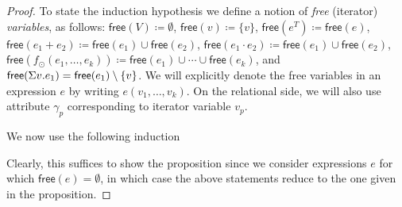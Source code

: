 \begin{proof}
To state the induction hypothesis we define a notion of \textit{free} (iterator) \textit{variables}, as follows:
$\mathsf{free}(V)\coloneqq \emptyset$, $\mathsf{free}(v)\coloneqq \{v\}$, $\mathsf{free}(e^T)\coloneqq \mathsf{free}(e)$, $\mathsf{free}(e_1+e_2)\coloneqq \mathsf{free}(e_1)\cup \mathsf{free}(e_2)$, $\mathsf{free}(e_1\cdot e_2)\coloneqq \mathsf{free}(e_1)\cup \mathsf{free}(e_2)$,
 $\mathsf{free}(f_\odot(e_1,\ldots,e_k))\coloneqq \mathsf{free}(e_1)\cup\cdots \cup \mathsf{free}(e_k)$, and $\mathsf{free}(\Sigma v. e_1)=\mathsf{free}(e_1)\setminus\{v\}$. We will explicitly denote the free variables in an expression $e$ by writing $e(v_1,\ldots,v_k)$.
On the relational side, we will also use attribute $\gamma_p$ corresponding to iterator variable $v_p$.

We now use the following induction 

Clearly, this suffices to show the proposition since we consider expressions $e$ for which $\mathsf{free}(e)=\emptyset$, in which case the above statements reduce to the one given in the proposition.



\end{proof}
